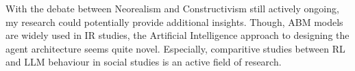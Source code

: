 With the debate between Neorealism and Constructivism still actively ongoing, my research could potentially provide additional insights. Though, ABM models are widely used in IR studies, the Artificial Intelligence approach to designing the agent architecture seems quite novel. Especially, comparitive studies between RL and LLM behaviour in social studies is an active field of research.

%
%
%
